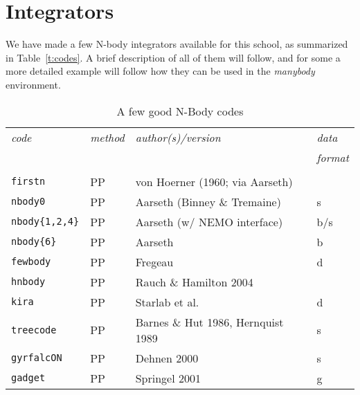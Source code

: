 \chapter                {Integrators}

We have made a few N-body integrators available for this school, as summarized
in Table~\ref{t:codes}. A brief description of all of them will follow, and 
for some a more detailed example will follow how they
can be used in the {\it manybody} environment. 



\begin{center}
\begin{table}[h]
\caption{A few good N-Body codes}
\begin{tabular}{||l|l|l|l||}

\hline 
{\it code} & {\it method} & {\it author(s)/version}  & {\it data} \\
       &&& {\it format} \\
\hline &&& \\

{\tt firstn} & PP & von Hoerner (1960; via Aarseth)  & \\

{\tt nbody0} & PP & Aarseth (Binney \& Tremaine) & s \\

{\tt nbody\{1,2,4\}} & PP & Aarseth (w/ NEMO interface) & b/s\\

{\tt nbody\{6\}} & PP &  Aarseth  & b \\

{\tt fewbody} & PP & Fregeau   & d \\

{\tt hnbody}  & PP & Rauch \& Hamilton 2004 & \\

{\tt kira} & PP & Starlab et al. & d \\

{\tt treecode} & PP & Barnes \& Hut 1986, Hernquist 1989 & s \\

{\tt gyrfalcON} & PP & Dehnen 2000 & s \\


{\tt gadget} & PP & Springel 2001  & g \\


\end{tabular}
\end{table}
\end{center}
